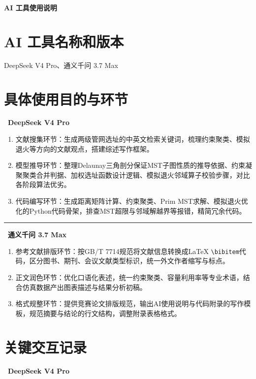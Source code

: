 \documentclass[12pt,a4paper]{ctexart}
\begin{document}
\begin{center}
{\heiti\bfseries AI 工具使用说明}
\end{center}

\section{AI 工具名称和版本}

DeepSeek V4 Pro、通义千问 3.7 Max

\section{具体使用目的与环节}

\noindent\textbf{\textbullet~DeepSeek V4 Pro}

\begin{enumerate}[label=(\arabic*)]
  \item 文献搜集环节：生成两级管网选址的中英文检索关键词，梳理约束聚类、模拟退火等方向的文献观点，搭建综述写作框架。
  \item 模型推导环节：整理Delaunay三角剖分保证MST子图性质的推导依据、约束凝聚聚类合并判据、加权选址函数设计逻辑、模拟退火邻域算子校验步骤，对比各阶段算法优劣。
  \item 代码编写环节：生成距离矩阵计算、约束聚类、Prim MST求解、模拟退火优化的Python代码骨架，排查MST超限与邻域解越界等报错，精简冗余代码。
\end{enumerate}

\noindent\rule{\linewidth}{0.4pt}

\noindent\textbf{\textbullet~通义千问 3.7 Max}

\begin{enumerate}[label=(\arabic*)]
  \item 参考文献排版环节：按GB/T 7714规范将文献信息转换成LaTeX \verb|\bibitem|代码，区分图书、期刊、会议文献类型标识，统一外文作者缩写与标点。
  \item 正文润色环节：优化口语化表述，统一约束聚类、容量利用率等专业术语，结合仿真数据产出图表描述与结果分析初稿。
  \item 格式规整环节：提供竞赛论文排版规范，输出AI使用说明与代码附录的写作模板，规范摘要与结论的行文结构，调整附录表格格式。
\end{enumerate}

\section{关键交互记录}

\noindent\textbf{\textbullet~DeepSeek V4 Pro}
\end{document}
